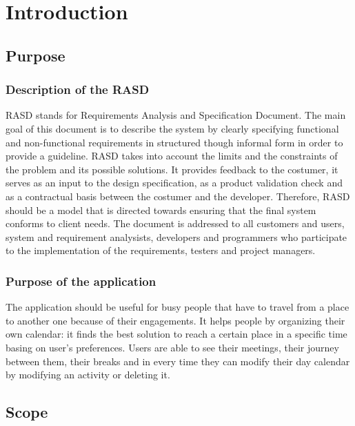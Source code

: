 \documentclass[12pt,titlepage]{article}
\begin{document}
\tableofcontents

\pagebreak

\section{Introduction} \label{introduzione}

\subsection{Purpose} \label{sec:purpose}

\medskip
\subsubsection{Description of the RASD}\label{RASD}
RASD stands for Requirements Analysis and Specification Document.
The main goal of this document is to describe the system by clearly specifying functional and non-functional requirements in structured though informal form in order to provide a guideline.
RASD takes into account the limits and the constraints of the problem and its possible solutions. 
It provides feedback to the costumer, it serves as an input to the design specification, as a product validation check and as a contractual basis between the costumer and the developer.
Therefore, RASD should be a model that is directed towards ensuring that the final system conforms to client needs.
The document is addressed to all customers and users, system and requirement analysists, developers and programmers who participate to the implementation of the requirements, testers and project managers.

\subsubsection{Purpose of the application}\label{RASD}
The application should be useful for busy people that have to travel from a place to another one because of their engagements. It helps people by organizing their own calendar: it finds the best solution to reach a certain place in a specific time basing on user's preferences. 
Users are able to see their meetings, their journey between them, their breaks and in every time they can modify their day calendar by modifying an activity or deleting it.

\subsection{Scope}\label{RASD}
\end{document}
